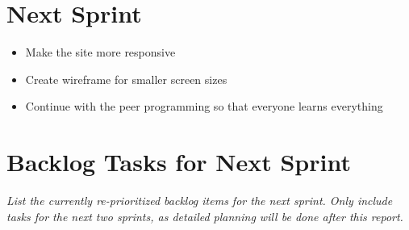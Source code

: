 \documentclass[a4paper,12pt]{article}
\begin{document}
\section{Next Sprint}
\begin{itemize}
    \item Make the site more responsive
    \item Create wireframe for smaller screen sizes
    \item Continue with the peer programming so that everyone learns everything
\end{itemize}

\section{Backlog Tasks for Next Sprint}
\textit{List the currently re-prioritized backlog items for the next sprint. Only include tasks for the next two sprints, as detailed planning will be done after this report.}
\end{document}
